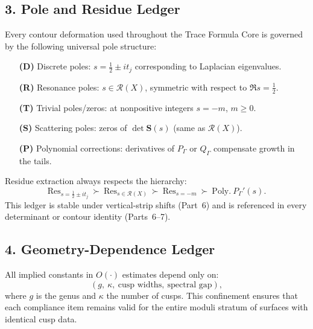 \subsection*{3. Pole and Residue Ledger}\relax\hspace{0pt}
\label{subsec:tfc8-poles}\relax\hspace{0pt}

Every contour deformation used throughout the Trace Formula Core is governed by the following universal pole structure:

\begin{itemize}
\item[\textbf{(D)}] Discrete poles: $s=\tfrac{1}{2}\pm i t_j$ corresponding to Laplacian eigenvalues.
\item[\textbf{(R)}] Resonance poles: $s\in\mathcal{R}(X)$, symmetric with respect to $\Re s=\tfrac{1}{2}$.
\item[\textbf{(T)}] Trivial poles/zeros: at nonpositive integers $s=-m$, $m\ge0$.
\item[\textbf{(S)}] Scattering poles: zeros of $\det\mathbf{S}(s)$ (same as $\mathcal{R}(X)$).
\item[\textbf{(P)}] Polynomial corrections: derivatives of $P_\Gamma$ or $Q_\Gamma$ compensate growth in the tails.
\end{itemize}

Residue extraction always respects the hierarchy:
\[
\text{Res}_{s=\tfrac{1}{2}\pm it_j}\ \succ\ 
\text{Res}_{s\in\mathcal{R}(X)}\ \succ\
\text{Res}_{s=-m}\ \succ\
\text{Poly.}\ P_\Gamma'(s).
\]
This ledger is stable under vertical-strip shifts (Part~6) and is referenced in every determinant or contour identity (Parts~6–7).\relax\hspace{0pt}

\subsection*{4. Geometry-Dependence Ledger}\relax\hspace{0pt}
\label{subsec:tfc8-geometry}\relax\hspace{0pt}

All implied constants in $O(\cdot)$ estimates depend only on:
\[
(g,\ \kappa,\ \text{cusp widths},\ \text{spectral gap}), 
\]
where $g$ is the genus and $\kappa$ the number of cusps.  
This confinement ensures that each compliance item remains valid for the entire moduli stratum of surfaces with identical cusp data.\relax\hspace{0pt}

